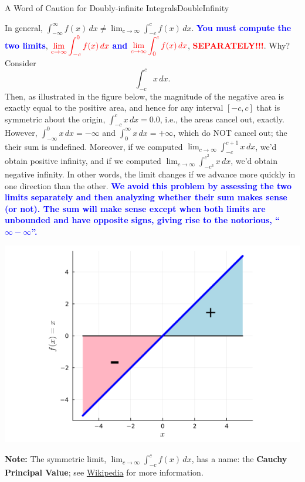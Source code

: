 \bigskip
\begin{funColor}{A Word of Caution for Doubly-infinite Integrals}{DoubleInfinity}

In general, $\int_{-\infty}^\infty f(x) \, dx \neq \displaystyle \lim_{c \to \infty} \int_{-c}^c f(x) \, dx$. \textcolor{blue}{\bf You must compute the two limits}, $\color{red} \displaystyle \lim_{c \to \infty} \int_{-c}^0 f(x) \, dx$ \textcolor{blue}{\bf and} $\color{red} \displaystyle \lim_{c \to \infty} \int_{0}^c f(x) \, dx$, \textcolor{red}{\bf SEPARATELY!!!}. Why? Consider
    $$\int_{-c}^c x \, dx.$$
    Then, as illustrated in the figure below, the magnitude of the negative area is exactly equal to the positive area, and hence for any interval $[-c, c]$ that is symmetric about the origin, $\int_{-c}^c x \, dx=0.0$, i.e., the areas cancel out, exactly. However, $\int_{-\infty}^0 x \, dx = -\infty$ and $\int_0^{\infty} x \, dx = +\infty$, which do NOT cancel out; the their sum is undefined. Moreover, if we computed $\displaystyle \lim_{c \to \infty}\int_{-c}^{c+1} x \, dx$, we'd obtain positive infinity, and if we computed  $\displaystyle \lim_{c \to \infty}\int_{-c^3}^{c^2} x \, dx$, we'd obtain negative infinity. In other words, the limit changes if we advance more quickly in one direction than the other. \textcolor{blue}{\bf We avoid this problem by assessing the two limits separately and then analyzing whether their sum makes sense (or not). The sum will make sense except when both limits are unbounded and have opposite signs, giving rise to the notorious, ``$\bm{\infty - \infty}$''.}

      \begin{center}
    \includegraphics[width=0.45\columnwidth]{graphics/Chap04/IntegralOfmonomialXSymmetricInterval.png}
    \end{center}

\textbf{Note:} The symmetric limit, $\displaystyle \lim_{c \to \infty} \int_{-c}^c f(x) \, dx$, has a name: the \textbf{Cauchy Principal Value}; see \href{https://en.wikipedia.org/wiki/Cauchy_principal_value}{Wikipedia} for more information.
\end{funColor}

